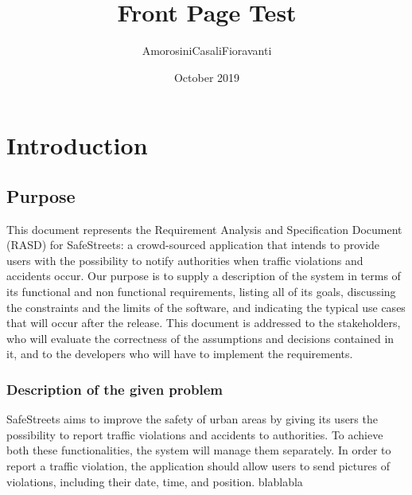 \documentclass{report}
\title{Front Page Test}
\author{AmorosiniCasaliFioravanti}
\date{October 2019}
\begin{document}
\maketitle 
\tableofcontents
\chapter{Introduction}
\section{Purpose}
This document represents the Requirement Analysis and Specification Document (RASD) for SafeStreets: a crowd-sourced application that intends to provide users with the possibility to notify authorities when traffic violations and accidents occur. Our purpose is to supply a description of the system in terms of its functional and non functional requirements, listing all of its goals, discussing the constraints and the limits of the software, and indicating the typical use cases that will occur after the release. This document is addressed to the stakeholders, who will evaluate the correctness of the assumptions and decisions contained in it, and to the developers who will have to implement the requirements.
\subsection{Description of the given problem}
SafeStreets aims to improve the safety of urban areas by giving its users the possibility to report traffic violations and accidents to authorities. To achieve both these functionalities, the system will manage them separately. In order to report a traffic violation, the application should allow users to send pictures of violations, including their date, time, and position. blablabla
\end{document}
